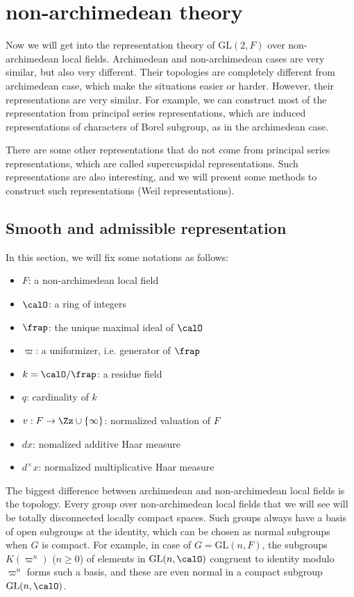 \documentclass{article}
\newcommand{\GL}{\mathrm{GL}}
\begin{document}

\newpage

\section{non-archimedean theory}
Now we will get into the representation theory of $\GL(2, F)$ over non-archimedean local fields. Archimedean and non-archimedean cases are very similar, but also very different. 
Their topologies are completely different from archimedean case, which make the situations easier or harder. However, their representations are very similar. For example, we can construct most of the representation from principal series representations, which are induced representations of characters of Borel subgroup, as in the archimedean case. 

There are some other representations that do not come from principal series representations, which are called supercuspidal representations. Such representations are also interesting, and we will present some methods to construct such representations (Weil representations). 

\subsection{Smooth and admissible representation}
In this section, we will fix some notations as follows:
\begin{itemize}
\item $F$: a non-archimedean local field
\item $\calO$: a ring of integers
\item $\frap$: the unique maximal ideal of $\calO$
\item $\varpi$: a uniformizer, i.e. generator of $\frap$
\item $k = \calO / \frap$: a residue field
\item $q$: cardinality of $k$
\item $v:F\to \Zz\cup\{\infty\}$: normalized valuation of $F$
\item $dx$: nomalized additive Haar measure
\item $d^{\times}x$: normalized multiplicative Haar measure
\end{itemize}
The biggest difference between archimedean and non-archimedean local fields is the topology. Every group over non-archimedean local fields that we will see will be totally disconnected locally compact spaces. 
Such groups always have a basis of open subgroups at the identity, which can be chosen as normal subgroups when $G$ is compact. 
For example, in case of $G = \GL(n, F)$, the subgroups $K(\varpi^{n})$ ($n\geq0$) of elements in $\GL(n, \calO)$ congruent to identity modulo $\varpi^{n}$ forms such a basis, and these are even normal in a compact subgroup $\GL(n, \calO)$. 
\end{document}
